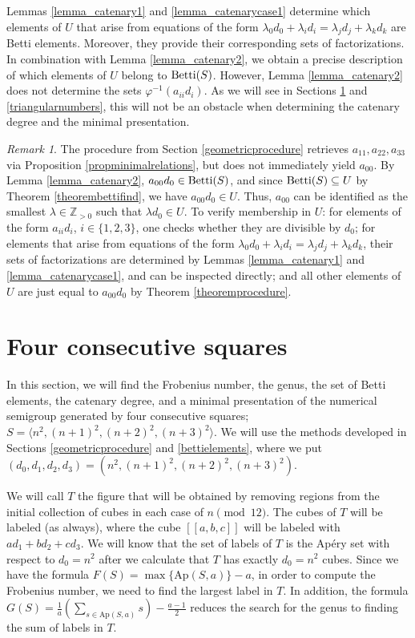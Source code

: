 \documentclass[12pt]{article}
\theoremstyle{remark}
\newtheorem{remark}[thm]{Remark}
\begin{document}
Lemmas \ref{lemma_catenary1} and \ref{lemma_catenarycase1} determine which elements of $U$ that arise from equations of the form $\lambda_0d_0 + \lambda_id_i = \lambda_jd_j + \lambda_k d_k$ are Betti elements. Moreover, they provide their corresponding sets of factorizations. In combination with Lemma \ref{lemma_catenary2}, we obtain a precise description of which elements of $U$ belong to $\textup{Betti}(S)$. However, Lemma \ref{lemma_catenary2} does not determine the sets $\varphi^{-1}(a_{ii}d_i)$. As we will see in Sections \ref{findingtheFnumber} and \ref{triangularnumbers}, this will not be an obstacle when determining the catenary degree and the minimal presentation.

\begin{remark}\label{remark_a00_procedure}
    The procedure from Section \ref{geometricprocedure} retrieves $a_{11},a_{22},a_{33}$ via Proposition \ref{propminimalrelations}, but does not immediately yield $a_{00}$. By Lemma \ref{lemma_catenary2}, $a_{00}d_0 \in \textup{Betti}(S)$, and since $\textup{Betti}(S) \subseteq U$ by Theorem \ref{theorembettifind}, we have $a_{00}d_0 \in U$. Thus, $a_{00}$ can be identified as the smallest $\lambda \in \mathbb{Z}_{>0}$ such that $\lambda d_0 \in U$. To verify membership in $U$: for elements of the form $a_{ii}d_i$, $i \in \{1,2,3\}$, one checks whether they are divisible by $d_0$; for elements that arise from equations of the form $\lambda_0d_0 + \lambda_id_i = \lambda_jd_j + \lambda_k d_k$, their sets of factorizations are determined by Lemmas \ref{lemma_catenary1} and \ref{lemma_catenarycase1}, and can be inspected directly; and all other elements of $U$ are just equal to $a_{00}d_0$ by Theorem \ref{theoremprocedure}.
\end{remark}


\section{Four consecutive squares}\label{findingtheFnumber}

In this section, we will find the Frobenius number, the genus, the set of Betti elements, the catenary degree, and a minimal presentation of the numerical semigroup generated by four consecutive squares; $S = \langle n^2,(n+1)^2,(n+2)^2,(n+3)^2 \rangle $.
We will use the methods developed in Sections \ref{geometricprocedure} and \ref{bettielements}, where we put $(d_0,d_1,d_2,d_3)=(n^2,(n+1)^2,(n+2)^2,(n+3)^2)$.

We will call $T$ the figure that will be obtained by removing regions from the initial collection of cubes in each case of $n \pmod{12}$. The cubes of $T$ will be labeled (as always), where the cube $[[a,b,c]]$ will be labeled with $ad_1 + bd_2 + cd_3$. We will know that the set of labels of $T$ is the Ap{\'e}ry set with respect to $d_0 = n^2$ after we calculate that $T$ has exactly $d_0 = n^2$ cubes.
Since we have the formula $F(S) = \max\{\text{Ap}(S,a) \}- a$, in order to compute the Frobenius number, we need to find the largest label in $T$. In addition, the formula $G(S) = \frac{1}{a} \left( \sum_{s \in \text{Ap}(S,a)} s \right) - \frac{a-1}{2}$ reduces the search for the genus to finding the sum of labels in $T$.
\end{document}
